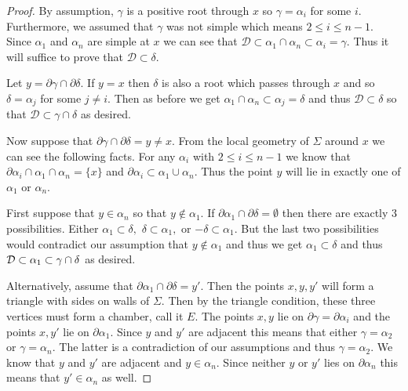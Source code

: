 \documentclass[class=book, crop=false,12 pt]{standalone}
\begin{document}
\begin{proof}
	By assumption, $\gamma$ is a positive root through $x$ so $\gamma=\alpha_i$ for some $i.$ Furthermore, we assumed that $\gamma$ was not simple which means $2\le i \le n-1.$ Since $\alpha_1$ and $\alpha_n$ are simple at $x$ we can see that $\mathcal{D}\subset \alpha_1\cap \alpha_n\subset \alpha_i=\gamma.$ Thus it will suffice to prove that $\mathcal{D}\subset \delta.$

	Let $y=\partial\gamma \cap \partial \delta.$ If $y=x$ then $\delta$ is also a root which passes through $x$ and so $\delta=\alpha_j$ for some $j\neq i.$ Then as before we get $\alpha_1\cap \alpha_n\subset \alpha_j=\delta$ and thus $\mathcal{D}\subset \delta$ so that $\mathcal{D}\subset \gamma\cap \delta$ as desired.

	Now suppose that $\partial \gamma\cap \partial \delta=y\neq x.$ From the local geometry of $\Sigma$ around $x$ we can see the following facts. For any $\alpha_i$ with $2\le i\le n-1$ we know that $\partial\alpha_i\cap \alpha_1\cap \alpha_n=\{x\}$ and $\partial\alpha_i\subset \alpha_1\cup\alpha_n.$ Thus the point $y$ will lie in exactly one of $\alpha_1$ or $\alpha_n.$

	First suppose that $y\in \alpha_n$ so that $y\not\in \alpha_1.$ If $\partial\alpha_1\cap \partial\delta=\emptyset$ then there are exactly 3 possibilities. Either $\alpha_1\subset \delta,$ $\delta\subset\alpha_1,$ or $-\delta\subset \alpha_1.$ But the last two possibilities would contradict our assumption that $y\not\in \alpha_1$ and thus we get $\alpha_1\subset \delta$ and thus $\mathcal{D}\subset \alpha_1\subset \gamma\cap\delta$ as desired.

	Alternatively, assume that $\partial\alpha_1\cap \partial\delta=y'.$ Then the points $x,y,y'$ will form a triangle with sides on walls of $\Sigma.$ Then by the triangle condition, these three vertices must form a chamber, call it $E.$ The points $x,y$ lie on $\partial\gamma=\partial\alpha_i$ and the points $x,y'$ lie on $\partial\alpha_1.$ Since $y$ and $y'$ are adjacent this means that either $\gamma=\alpha_2$ or $\gamma=\alpha_n.$ The latter is a contradiction of our assumptions and thus $\gamma=\alpha_2.$ We know that $y$ and $y'$ are adjacent and $y\in \alpha_n.$ Since neither $y$ or $y'$ lies on $\partial\alpha_n$ this means that $y'\in \alpha_n$ as well.


\end{proof}
\end{document}
